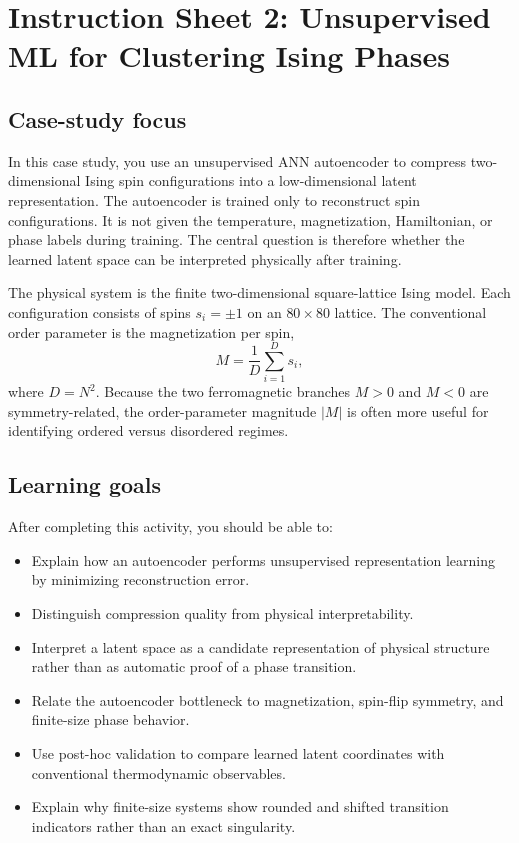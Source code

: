 \section*{Instruction Sheet 2: Unsupervised ML for Clustering Ising Phases}

\subsection*{Case-study focus}
In this case study, you use an unsupervised ANN autoencoder to compress two-dimensional Ising spin configurations into a low-dimensional latent representation. The autoencoder is trained only to reconstruct spin configurations. It is not given the temperature, magnetization, Hamiltonian, or phase labels during training. The central question is therefore whether the learned latent space can be interpreted physically after training.

The physical system is the finite two-dimensional square-lattice Ising model. Each configuration consists of spins \(s_i=\pm 1\) on an \(80\times 80\) lattice. The conventional order parameter is the magnetization per spin,
\[
M=\frac{1}{D}\sum_{i=1}^{D}s_i,
\]
where \(D=N^2\). Because the two ferromagnetic branches \(M>0\) and \(M<0\) are symmetry-related, the order-parameter magnitude \(|M|\) is often more useful for identifying ordered versus disordered regimes.

\subsection*{Learning goals}
After completing this activity, you should be able to:
\begin{itemize}
    \item Explain how an autoencoder performs unsupervised representation learning by minimizing reconstruction error.
    \item Distinguish compression quality from physical interpretability.
    \item Interpret a latent space as a candidate representation of physical structure rather than as automatic proof of a phase transition.
    \item Relate the autoencoder bottleneck to magnetization, spin-flip symmetry, and finite-size phase behavior.
    \item Use post-hoc validation to compare learned latent coordinates with conventional thermodynamic observables.
    \item Explain why finite-size systems show rounded and shifted transition indicators rather than an exact singularity.
\end{itemize}

